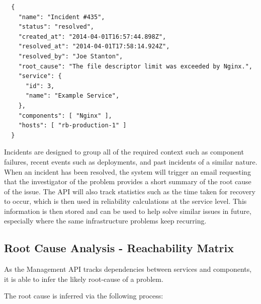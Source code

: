 \documentclass{cshonours}
\begin{document}
\begin{listing}[h]
\begin{verbatim}
  {
    "name": "Incident #435",
    "status": "resolved",
    "created_at": "2014-04-01T16:57:44.898Z",
    "resolved_at": "2014-04-01T17:58:14.924Z",
    "resolved_by": "Joe Stanton",
    "root_cause": "The file descriptor limit was exceeded by Nginx.",
    "service": {
      "id": 3,
      "name": "Example Service",
    },
    "components": [ "Nginx" ],
    "hosts": [ "rb-production-1" ]
  }
\end{verbatim}
\end{listing}

Incidents are designed to group all of the required context such as component failures, recent events such as deployments, and past incidents of a similar nature. When an incident has been resolved, the system will trigger an email requesting that the investigator of the problem provides a short summary of the root cause of the issue. The API will also track statistics such as the time taken for recovery to occur, which is then used in reliability calculations at the service level. This information is then stored and can be used to help solve similar issues in future, especially where the same infrastructure problems keep recurring.

\pagebreak
\subsection{Root Cause Analysis - Reachability Matrix}

As the Management API tracks dependencies between services and components, it is able to infer the likely root-cause of a problem.

The root cause is inferred via the following process:
\end{document}
